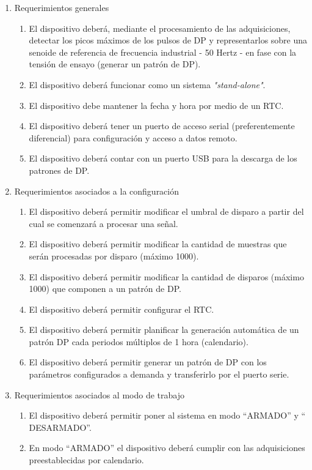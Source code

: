 \documentclass[11pt]{charter}
\begin{document}
\begin{enumerate}
\item Requerimientos generales
	\begin{enumerate}
	\item El dispositivo deberá, mediante el procesamiento de las adquisiciones, detectar los picos máximos de los pulsos de DP y representarlos sobre una senoide de referencia de frecuencia industrial - 50 Hertz - en fase con la tensión de ensayo (generar un patrón de DP).
	\item El dispositivo deberá funcionar como un sistema \textit{"stand-alone"}.
	\item El dispositivo debe mantener la fecha y hora por medio de un RTC.
	\item El dispositivo deberá tener un puerto de acceso serial (preferentemente diferencial) para configuración y acceso a datos remoto.
	\item El dispositivo deberá contar con un puerto USB para la descarga de los patrones de DP.
	\end{enumerate}
\item Requerimientos asociados a la configuración
	\begin{enumerate}
	\item El dispositivo deberá permitir modificar el umbral de disparo a partir del cual se comenzará a procesar una señal.
	\item El dispositivo deberá permitir modificar la cantidad de muestras que serán procesadas por disparo (máximo 1000).
	\item El dispositivo deberá permitir modificar la cantidad de disparos (máximo 1000) que componen a un patrón de DP.
	\item El dispositivo deberá permitir configurar el RTC.
	\item El dispositivo deberá permitir planificar la generación automática de un patrón DP cada periodos múltiplos de 1 hora (calendario).
	\item El dispositivo deberá permitir generar un patrón de DP con los parámetros configurados a demanda y transferirlo por el puerto serie.
	\end{enumerate}
\item Requerimientos asociados al modo de trabajo
	\begin{enumerate}
	\item El dispositivo deberá permitir poner al sistema en modo “ARMADO” y “ DESARMADO”.
	\item En modo “ARMADO” el dispositivo deberá cumplir con las adquisiciones preestablecidas por calendario.

\end{enumerate}
\end{enumerate}
\end{document}
